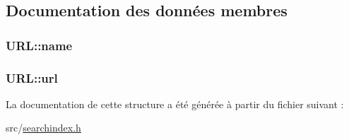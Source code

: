 \subsection{Documentation des données membres}
\hypertarget{struct_u_r_l_ab8824448990462ddf08bb88c3a312dd2}{}
\subsubsection[{name}]{ U\+R\+L\+::name}\label{struct_u_r_l_ab8824448990462ddf08bb88c3a312dd2}
\hypertarget{struct_u_r_l_a35202d2b5bac50f6471d23cf6db253cf}{}
\subsubsection[{url}]{ U\+R\+L\+::url}\label{struct_u_r_l_a35202d2b5bac50f6471d23cf6db253cf}


La documentation de cette structure a été générée à partir du fichier suivant \+:\begin{DoxyCompactItemize}
\item 
src/\hyperlink{searchindex_8h}{searchindex.\+h}\end{DoxyCompactItemize}
